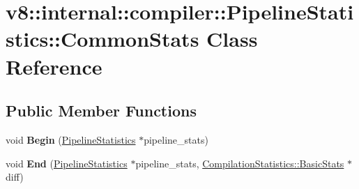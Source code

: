 \hypertarget{classv8_1_1internal_1_1compiler_1_1_pipeline_statistics_1_1_common_stats}{}\section{v8\+:\+:internal\+:\+:compiler\+:\+:Pipeline\+Statistics\+:\+:Common\+Stats Class Reference}
\label{classv8_1_1internal_1_1compiler_1_1_pipeline_statistics_1_1_common_stats}
\subsection*{Public Member Functions}
\begin{DoxyCompactItemize}
\item 
void {\bfseries Begin} (\hyperlink{classv8_1_1internal_1_1compiler_1_1_pipeline_statistics}{Pipeline\+Statistics} $\ast$pipeline\+\_\+stats)\hypertarget{classv8_1_1internal_1_1compiler_1_1_pipeline_statistics_1_1_common_stats_a84de449ce186aceb64d9fe692bfc5d4b}{}\label{classv8_1_1internal_1_1compiler_1_1_pipeline_statistics_1_1_common_stats_a84de449ce186aceb64d9fe692bfc5d4b}

\item 
void {\bfseries End} (\hyperlink{classv8_1_1internal_1_1compiler_1_1_pipeline_statistics}{Pipeline\+Statistics} $\ast$pipeline\+\_\+stats, \hyperlink{classv8_1_1internal_1_1_compilation_statistics_1_1_basic_stats}{Compilation\+Statistics\+::\+Basic\+Stats} $\ast$diff)\hypertarget{classv8_1_1internal_1_1compiler_1_1_pipeline_statistics_1_1_common_stats_ad87ef48c4c50b3141ab5e32f947f39cf}{}\label{classv8_1_1internal_1_1compiler_1_1_pipeline_statistics_1_1_common_stats_ad87ef48c4c50b3141ab5e32f947f39cf}

\end{DoxyCompactItemize}
